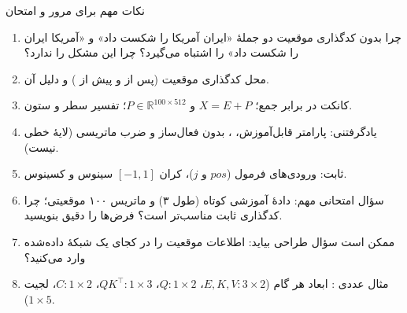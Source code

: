 \begin{exambox}{نکات مهم برای مرور و امتحان}
\begin{enumerate}
  \item چرا  بدون کدگذاری موقعیت دو جملهٔ «ایران آمریکا را شکست داد» و «آمریکا ایران را شکست داد» را اشتباه می‌گیرد؟ چرا  این مشکل را ندارد؟
  \item محل کدگذاری موقعیت (پس از  و پیش از ) و دلیل آن.
  \item کانکت در برابر جمع؛ $X=E+P$ و $P\in\mathbb{R}^{100\times512}$؛ تفسیر سطر و ستون.
  \item یادگرفتنی: پارامتر قابل‌آموزش، ، بدون فعال‌ساز و ضرب ماتریسی (لایهٔ خطی نیست).
  \item ثابت: ورودی‌های فرمول ($pos$ و $j$)، کران $[-1,1]$ سینوس و کسینوس.
  \item سؤال امتحانی مهم: دادهٔ آموزشی کوتاه (طول ۳) و ماتریس ۱۰۰ موقعیتی؛ چرا کدگذاری ثابت مناسب‌تر است؟ فرض‌ها را دقیق بنویسید.
  \item ممکن است سؤال طراحی بیاید: اطلاعات موقعیت را در کجای یک شبکهٔ داده‌شده وارد می‌کنید؟
  \item مثال عددی : ابعاد هر گام ($E,K,V:3\times2$، $Q:1\times2$، $QK^\top:1\times3$، $C:1\times2$، لجیت $1\times5$).
\end{enumerate}
\end{exambox}
